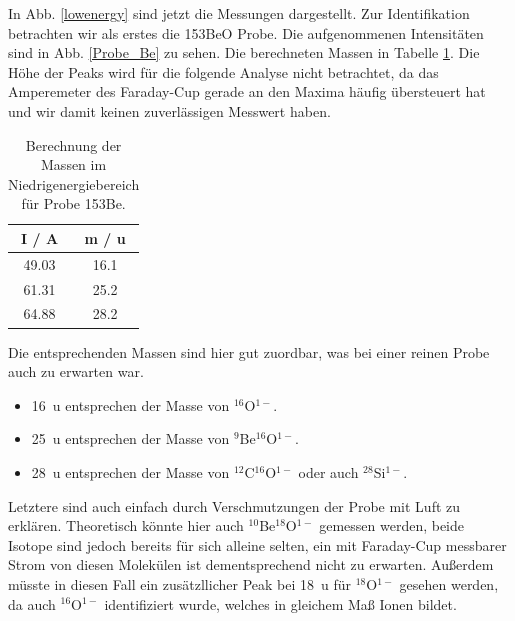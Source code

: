 In Abb. \ref{lowenergy} sind jetzt die Messungen dargestellt.
Zur Identifikation betrachten wir als erstes die 153BeO Probe.
Die aufgenommenen Intensitäten sind in Abb. \ref{Probe_Be} zu sehen.
Die berechneten Massen in Tabelle \ref{153Be}.
Die Höhe der Peaks wird für die folgende Analyse nicht betrachtet, da das Amperemeter des Faraday-Cup gerade an den Maxima häufig übersteuert hat und wir damit keinen zuverlässigen Messwert haben.
\begin{table}[h]
    \centering
    \caption{Berechnung der Massen im Niedrigenergiebereich für Probe 153Be.}
    \begin{tabular}{|c |c|}
        \hline
        I / \si{\ampere} & m / \si{\atomicmassunit} \\
        \hline
        \num{49.03} & \num{16.1} \\
        \num{61.31} & \num{25.2} \\
        \num{64.88} & \num{28.2} \\
        \hline
    \end{tabular}
    \label{153Be}
\end{table}
Die entsprechenden Massen sind hier gut zuordbar, was bei einer reinen Probe auch zu erwarten war.
\begin{itemize}
    \item \SI{16}{\atomicmassunit} entsprechen der Masse von $^{16}$O$^{1-}$.
    \item \SI{25}{\atomicmassunit} entsprechen der Masse von $^{9}$Be$^{16}$O$^{1-}$.
    \item \SI{28}{\atomicmassunit} entsprechen der Masse von $^{12}$C$^{16}$O$^{1-}$ oder auch $^{28}$Si$^{1-}$.
\end{itemize}
Letztere sind auch einfach durch Verschmutzungen der Probe mit Luft zu erklären.
Theoretisch könnte hier auch $^{10}$Be$^{18}$O$^{1-}$ gemessen werden, beide Isotope sind jedoch bereits für sich alleine selten, ein mit Faraday-Cup messbarer Strom von diesen Molekülen ist dementsprechend nicht zu erwarten.
Außerdem müsste in diesen Fall ein zusätzllicher Peak bei \SI{18}{\atomicmassunit} für $^{18}$O$^{1-}$ gesehen werden, da auch $^{16}$O$^{1-}$ identifiziert wurde, welches in gleichem Maß Ionen bildet.
